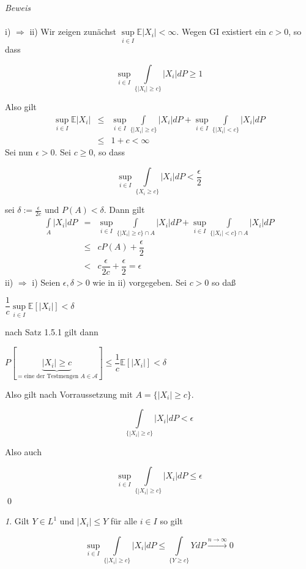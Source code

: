 \documentclass[10pt,a4paper]{report}
\newcommand{\E}{\mathbb{E}}
\numberwithin{equation}{section}
\numberwithin{figure}{section}
\theoremstyle{plain}
\theoremstyle{definition}
\theoremstyle{plain}
\theoremstyle{definition}
\theoremstyle{remark}
\newtheorem{rem}{\protect\remarkname}[section]
\theoremstyle{plain}
\theoremstyle{plain}
\theoremstyle{plain}
\theoremstyle{plain}
\theoremstyle{plain}
\providecommand{\remarkname}{Bemerkung}
\newcommand{\1}{ \mathbb{1} } %
\begin{document}
\textit{Beweis}\\\\
i) $\Rightarrow$ ii) Wir zeigen zunächst $\sup\limits_{i \in I} \E|X_i| < \infty$. Wegen GI existiert ein $c>0$, so dass 
\begin{center}
\[\sup\limits_{i \in I} \int\limits_{\{|X_i|\geq c\}}|X_i|dP\geq 1\]
\end{center}
Also gilt
\begin{eqnarray*}
\sup\limits_{i \in I} \E|X_i| &\leq& \sup\limits_{i \in I}\int\limits_{\{|X_i|\geq c\}}|X_i|dP+ \sup\limits_{i \in I}\int\limits_{\{|X_i|< c\}}|X_i|dP\\
&\leq & 1+c < \infty 
\end{eqnarray*}
Sei nun $\epsilon >0$. Sei $c\geq 0$, so dass
\begin{center}
\[\sup\limits_{i \in I} \int\limits_{\{X_i \geq c\}}|X_i|dP <\dfrac{\epsilon}{2}\]
\end{center}
sei $ \delta:=\frac{\epsilon}{2c}$ und $P(A)<\delta$. Dann gilt
\begin{eqnarray*}
\int\limits_A|X_i|dP&=&\sup\limits_{i \in I}\int\limits_{\{|X_i|\geq c\}\cap A}|X_i|dP+ \sup\limits_{i \in I}\int\limits_{\{|X_i|< c\}\cap A}|X_i|dP\\
&\leq & cP(A)+\dfrac{\epsilon}{2}\\
&<& c\dfrac{\epsilon}{2c}+\dfrac{\epsilon}{2}=\epsilon
\end{eqnarray*}
ii) $\Rightarrow$ i) Seien $\epsilon, \delta >0 $ wie in ii) vorgegeben. Sei $c>0$ so daß
\begin{center}
$\dfrac{1}{c}\sup\limits_{i \in I} \E[|X_i|]<\delta$
\end{center}
nach Satz 1.5.1 gilt dann
\begin{center}
$P[\underbrace{|X_i|\geq c}_{= \text{eine der Testmengen } A \in \mathcal{A}}]\leq \dfrac{1}{c}\E[|X_i|]<\delta$
\end{center}
Also gilt nach Vorraussetzung mit $A=\{|X_i|\geq c\}$.
\begin{center}
\[\int\limits_{\{|X_i|\geq c\}}|X_i|dP < \epsilon\]
\end{center}
Also auch
\begin{center}
\[\sup\limits_{i \in I}\int\limits_{\{|X_i|\geq c\}}|X_i|dP \leq \epsilon \] \qed
\end{center}
\begin{rem}
  Gilt $Y \in L^1$ und $|X_i| \leq Y$ für alle $i \in I$ so gilt
  \begin{center}
    \[\sup\limits_{i \in I} \int\limits_{\{|X_i|\geq c\}}|X_i|dP \leq
    \int\limits_{\{Y \geq c\}}Y dP \overset{n \to \infty}{\to} 0 \]
  \end{center}
\end{rem}
\end{document}
